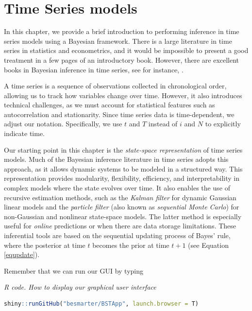 \chapter{Time Series models}\label{chap8}
In this chapter, we provide a brief introduction to performing inference in time series models using a Bayesian framework. There is a large literature in time series in statistics and econometrics, and it would be impossible to present a good treatment in a few pages of an introductory book. However, there are excellent books in Bayesian inference in time series, see for instance, \cite{west2006bayesian,petris2009dynamic,pole2018applied}.

A time series is a sequence of observations collected in chronological order, allowing us to track how variables change over time. However, it also introduces technical challenges, as we must account for statistical features such as autocorrelation and stationarity. Since time series data is time-dependent, we adjust our notation. Specifically, we use $t$ and $T$ instead of $i$ and $N$ to explicitly indicate time.

Our starting point in this chapter is the \textit{state-space representation} of time series models. Much of the Bayesian inference literature in time series adopts this approach, as it allows dynamic systems to be modeled in a structured way. This representation provides modularity, flexibility, efficiency, and interpretability in complex models where the state evolves over time. It also enables the use of recursive estimation methods, such as the \textit{Kalman filter} for dynamic Gaussian linear models and the \textit{particle filter} (also known as \textit{sequential Monte Carlo}) for non-Gaussian and nonlinear state-space models. The latter method is especially useful for \textit{online} predictions or when there are data storage limitations. These inferential tools are based on the sequential updating process of Bayes' rule, where the posterior at time $t$ becomes the prior at time $t+1$ (see Equation \ref{equpdate}).

Remember that we can run our GUI by typing

\begin{tcolorbox}[enhanced,width=4.67in,center upper,
	fontupper=\large\bfseries,drop shadow southwest,sharp corners]
	\textit{R code. How to display our graphical user interface}
	\begin{VF}
		\begin{lstlisting}[language=R]
		shiny::runGitHub("besmarter/BSTApp", launch.browser = T)\end{lstlisting}
	\end{VF}
\end{tcolorbox} 

